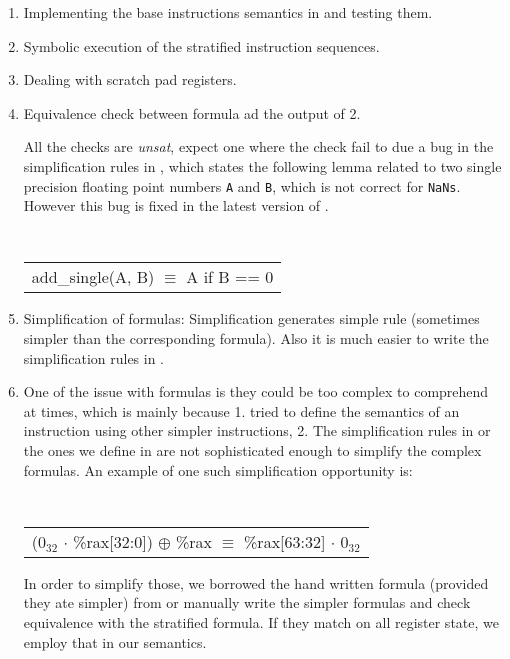 \begin{enumerate}
\item Implementing the base instructions semantics in \K and testing them.
\item Symbolic execution of the stratified instruction sequences.
\item Dealing with scratch pad registers.
\item Equivalence check between \Strata formula ad the output of 2.
   
   All the checks are \emph{unsat}, expect one where the check fail to due a bug in the simplification
   rules in \Strata, which states the following lemma related to two single precision floating point numbers  {\tt A}  and {\tt B}, which is not correct for {\tt NaNs}. However this bug is fixed in 
   the latest version of \Stoke. 
   
   
   { \tt  
        \begin{tabular}[b]{l}
   \qquad add\_single(A, B) $\equiv$ A if B == 0     
      \end{tabular}
  }
   
\item {Simplification of formulas:}
  Simplification generates simple \K rule (sometimes simpler than the corresponding \Strata formula).
 Also it is much easier to write the simplification rules in
  \K.


\item One of the issue with \Strata formulas is they could be too complex to comprehend at times, which is mainly because 1. \Strata tried to define the semantics of an instruction using other simpler instructions, 2. The simplification rules in \Strata or the ones we define in \K are not sophisticated enough to simplify the complex formulas. An example of one such simplification opportunity is: 
     { \tt  
      \begin{tabular}[b]{l}
          ($0_{32}$ $\cdot$ \%rax[32:0]) $\oplus$ \%rax $\equiv$ \%rax[63:32] $\cdot$  $0_{32}$ 
      \end{tabular}
    }

In order to simplify those, we borrowed the hand written formula (provided they ate simpler)  from \Stoke or manually write the simpler formulas  and check equivalence with the stratified formula. If they match on all register state, we employ that in our \K semantics.       


\end{enumerate}

